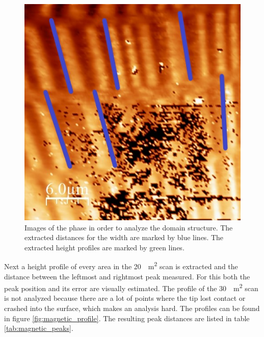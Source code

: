 \documentclass[%
 reprint,
amsmath,amssymb,
pra,
]{revtex4-1}
\begin{document}
\begin{figure}
\includegraphics[scale=0.45]{Bilder/Magnetic/try4_lines.jpg}
\caption{Images of the phase in order to analyze the domain structure. The extracted distances for the width are marked by blue lines. The extracted height profiles are marked by green lines.}
\label{fig:magnetic_domain}
\end{figure}

Next a height profile of every area in the \SI{20}{\mu m^2} scan is extracted and the distance between the leftmost and rightmost peak measured. For this both the peak position and its error are visually estimated. The profile of the \SI{30}{\mu m^2} scan is not analyzed because there are a lot of points where the tip lost contact or crashed into the surface, which makes an analysis hard. The profiles can be found in figure \ref{fig:magnetic_profile}. The resulting peak distances are listed in table \ref{tab:magnetic_peaks}.
\end{document}
